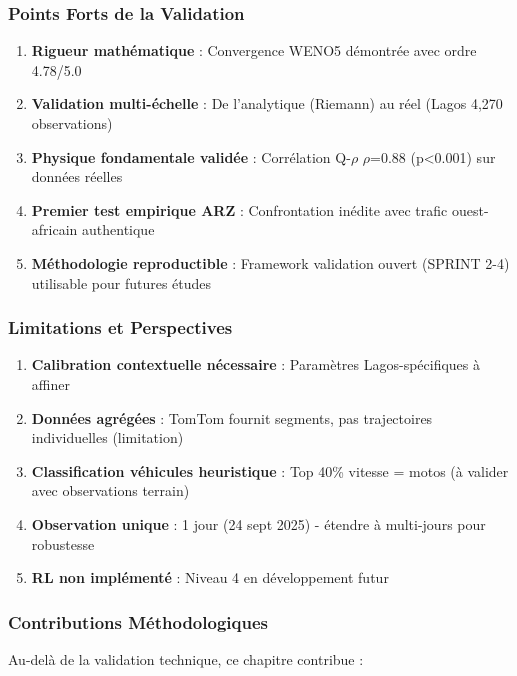 \subsubsection{Points Forts de la Validation}
\label{subsec:points_forts}

\begin{enumerate}
    \item \textbf{Rigueur mathématique} : Convergence WENO5 démontrée avec ordre 4.78/5.0
    \item \textbf{Validation multi-échelle} : De l'analytique (Riemann) au réel (Lagos 4,270 observations)
    \item \textbf{Physique fondamentale validée} : Corrélation Q-$\rho$ $\rho$=0.88 (p<0.001) sur données réelles
    \item \textbf{Premier test empirique ARZ} : Confrontation inédite avec trafic ouest-africain authentique
    \item \textbf{Méthodologie reproductible} : Framework validation ouvert (SPRINT 2-4) utilisable pour futures études
\end{enumerate}

\subsubsection{Limitations et Perspectives}
\label{subsec:limitations_perspectives}

\begin{enumerate}
    \item \textbf{Calibration contextuelle nécessaire} : Paramètres Lagos-spécifiques à affiner
    \item \textbf{Données agrégées} : TomTom fournit segments, pas trajectoires individuelles (limitation)
    \item \textbf{Classification véhicules heuristique} : Top 40\% vitesse = motos (à valider avec observations terrain)
    \item \textbf{Observation unique} : 1 jour (24 sept 2025) - étendre à multi-jours pour robustesse
    \item \textbf{RL non implémenté} : Niveau 4 en développement futur
\end{enumerate}

\subsubsection{Contributions Méthodologiques}
\label{subsec:contributions_methodologiques}

Au-delà de la validation technique, ce chapitre contribue :

